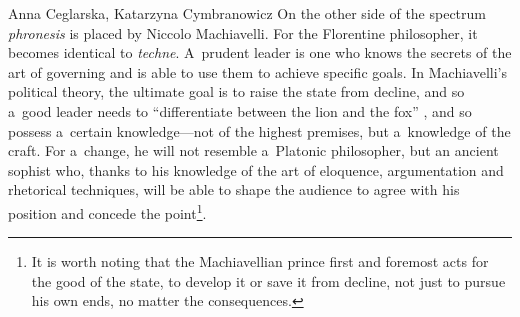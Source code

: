 \begin{artengenv2auth}{Anna Ceglarska, Katarzyna Cymbranowicz}
On the other side of the spectrum \textit{phronesis} is placed by Niccolo Machiavelli. For the Florentine philosopher, it becomes identical to \textit{techne}. A~prudent leader is one who knows the secrets of the art of governing and is able to use them to achieve specific goals. In Machiavelli's political theory, the ultimate goal is to raise the state from decline, and so a~good leader needs to ``differentiate between the lion and the fox'' 
\parencite[][p.96]{machiavelli_prince_2003}, %
 and so possess a~certain knowledge---not of the highest premises, but a~knowledge of the craft. For a~change, he will not resemble a~Platonic philosopher, but an ancient sophist who, thanks to his knowledge of the art of eloquence, argumentation and rhetorical techniques, will be able to shape the audience to agree with his position and concede the point\footnote{It is worth noting that the Machiavellian prince first and foremost acts for the good of the state, to develop it or save it from decline, not just to pursue his own ends, no matter the consequences.}.




\end{artengenv2auth}
